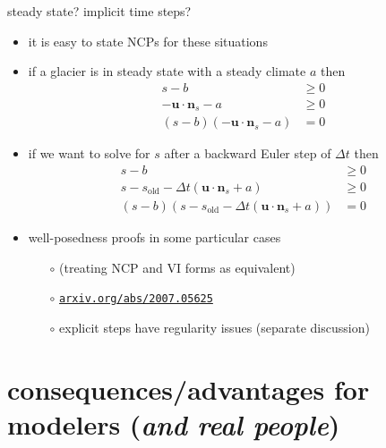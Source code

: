 \documentclass[10pt,hyperref,dvipsnames]{beamer}
\newcommand{\bn}{\mathbf{n}}
\newcommand{\bu}{\mathbf{u}}
\begin{document}
\begin{frame}{steady state? implicit time steps?}
\begin{itemize}
\item it is easy to state NCPs for these situations
\item if a glacier is in steady state with a steady climate $a$ then
\begin{align*}
s-b &\ge 0 \\
- \bu \cdot \bn_s - a &\ge 0 \\
(s-b) \left(- \bu \cdot \bn_s - a\right) &= 0
\end{align*}
\item if we want to solve for $s$ after a backward Euler step of $\Delta t$ then
\begin{align*}
s-b &\ge 0 \\
s - s_{\text{old}} - \Delta t\left(\bu \cdot \bn_s + a\right) &\ge 0 \\
(s-b) \left(s - s_{\text{old}} - \Delta t\left(\bu \cdot \bn_s + a\right)\right) &= 0
\end{align*}
\item well-posedness proofs in some particular cases
    \begin{itemize}
    \item[$\circ$] (treating NCP and VI forms as equivalent)
    \item[$\circ$] \href{https://arxiv.org/abs/2007.05625}{\texttt{arxiv.org/abs/2007.05625}}
    \item[$\circ$] explicit steps have regularity issues (separate discussion)
    \end{itemize}
\end{itemize}
\end{frame}


\section{consequences/advantages for modelers (\emph{and real people})}
\end{document}
